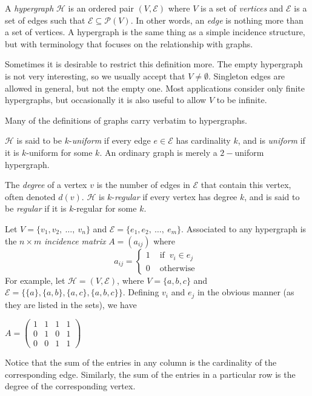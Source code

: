 \documentclass[12pt]{article}
\begin{document}
A \emph{hypergraph} $\mathcal{H}$ is an ordered pair $(V, \mathcal{E})$ where $V$ is a set of \emph{vertices} and $\mathcal{E}$ is a set of edges such that $\mathcal{E} \subseteq \mathcal{P}(V)$.  In other words, an \emph{edge} is nothing more than a set of vertices. A hypergraph is the same thing as a simple incidence structure, but with terminology that focuses on the relationship with graphs.

Sometimes it is desirable to restrict this definition more.  The empty hypergraph is not very interesting, so we usually accept that $V \not= \emptyset$.  Singleton edges are allowed in general, but not the empty one.  Most applications consider only finite hypergraphs, but occasionally it is also useful to allow $V$ to be infinite.

Many of the definitions of graphs carry verbatim to hypergraphs.  

$\mathcal{H}$ is said to be $k$-\emph{uniform} if every edge $e \in \mathcal{E}$ has cardinality $k$, and is \emph{uniform} if it is $k$-uniform for some $k$.  An ordinary graph is merely a $2-$uniform hypergraph.

The \emph{degree} of a vertex $v$ is the number of edges in $\mathcal{E}$ that contain this vertex, often denoted $d(v)$.  $\mathcal{H}$ is $k$-\emph{regular} if every vertex has degree $k$, and is said to be \emph{regular} if it is $k$-regular for some $k$.

Let $V = \{v_1, v_2, ~\ldots, ~ v_n\}$ and $\mathcal{E} = \{e_1, e_2, ~ \ldots, ~ e_m\}$.  Associated to any hypergraph is the $n \times m$ \emph{incidence matrix} $A = (a_{ij})$ where
\[a_{ij} = 
\begin{cases}
1 &\text{ if } ~ v_i \in e_j \\
0 &\text{ otherwise }
\end{cases}\]
For example, let $\mathcal{H}=(V,\mathcal{E})$, where $V=\lbrace a,b,c\rbrace$ and $\mathcal{E}=\lbrace \lbrace a\rbrace, \lbrace a,b\rbrace, \lbrace a,c\rbrace, \lbrace a,b,c\rbrace\rbrace$.  Defining $v_i$ and $e_j$ in the obvious manner (as they are listed in the sets), we have
\begin{center}$A =
\begin{pmatrix}
1 & 1 & 1 & 1 \\
0 & 1 & 0 & 1 \\
0 & 0 & 1 & 1
\end{pmatrix}$
\end{center}
Notice that the sum of the entries in any column is the cardinality of the corresponding edge.  Similarly, the sum of the entries in a particular row is the degree of the corresponding vertex.
\end{document}
